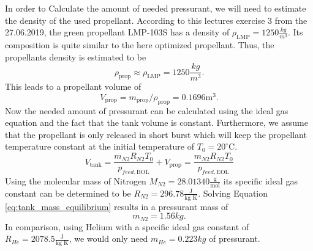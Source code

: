 \documentclass[12pt]{article}
\begin{document}
In order to Calculate the amount of needed pressurant, we will need to estimate the density of the used propellant. According to this lectures exercise 3 from the 27.06.2019, the green propellant LMP-103S has a density of $\rho_{\text{LMP}}=1250 \frac{kg}{m^3}$. Its composition is quite similar to the here optimized propellant. Thus, the propellants density is estimated to be
\begin{equation*}
	\rho_{\text{prop}} \approx \rho_{\text{LMP}}=1250 \frac{kg}{m^3}.
\end{equation*}
This leads to a propellant volume of 
\begin{equation*}
V_{\text{prop}} = m_{\text{prop}} / \rho_{\text{prop}} = 0.1696 \text{m}^3.
\end{equation*}
Now the needed amount of pressurant can be calculated using the ideal gas equation and the fact that the tank volume is constant. Furthermore, we assume that the propellant is only released in short burst which will keep the propellant temperature constant at the initial temperature of $T_0=20^\circ\text{C}$.
\begin{equation}
V_{\text{tank}} = \frac{m_{N2} R_{N2} T_0}{p_{feed,\text{BOL}}} + V_{\text{prop}} = \frac{m_{N2} R_{N2} T_0}{p_{feed,\text{EOL}}}
\label{eq:tank_mass_equilibrium}
\end{equation}
Using the molecular mass of Nitrogen $M_{N2}=28.01340\frac{\text{g}}{\text{mol}}$ its specific ideal gas constant can be determined to be $R_{N2}=296.78 \frac{\text{J}}{\text{kg K}}$.
Solving Equation \ref{eq:tank_mass_equilibrium} results in a pressurant mass of
\begin{equation*}
	m_{N2} = 1.56kg.
\end{equation*}
In comparison, using Helium with a specific ideal gas constant of $R_{He}=2078.5 \frac{\text{J}}{\text{kg K}}$, we would only need $m_{He}=0.223kg$ of pressurant.\\
\end{document}
